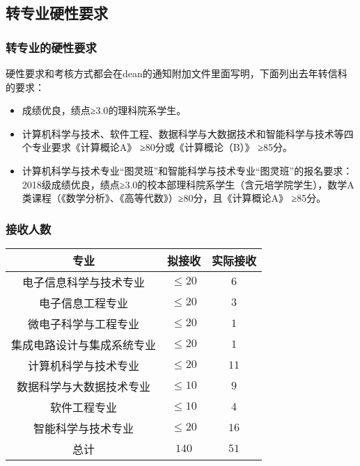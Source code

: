 \documentclass[12pt,AutoFakeBold]{beamer}
\begin{document}
    \subsection{转专业硬性要求}
    \begin{frame}
        \frametitle{转专业的硬性要求}
        硬性要求和考核方式都会在dean的通知附加文件里面写明，下面列出去年转信科的要求：

        \begin{itemize}
            \item 成绩优良，\alert{绩点≥3.0}的理科院系学生。
            \item 计算机科学与技术、软件工程、数据科学与大数据技术和智能科学与技术等四个专业要求\alert{《计算概论A》 ≥80分或《计算概论（B）》 ≥85分}。
            \item 计算机科学与技术专业“图灵班”和智能科学与技术专业“图灵班”的报名要求：2018级成绩优良，绩点≥3.0的校本部理科院系学生（含元培学院学生），数学A类课程（《数学分析》、《高等代数》）≥80分，且《计算概论A》 ≥85分。
        \end{itemize}
    \end{frame}
    \begin{frame}
        \frametitle{接收人数}
        \begin{center}
            \begin{tabular}{ccc}
                \toprule
                专业&拟接收&实际接收\\
                \midrule
                电子信息科学与技术专业&$≤20$&$6$\\
                电子信息工程专业&$≤20$&$3$\\
                微电子科学与工程专业&$≤20$&$1$\\
                集成电路设计与集成系统专业&$≤20$&$1$\\
                计算机科学与技术专业&$≤20$&$11$\\
                数据科学与大数据技术专业&$≤10$&$9$\\
                软件工程专业&$≤10$&$4$\\
                智能科学与技术专业&$≤20$&$16$\\
                总计&$140$&$51$\\
                \bottomrule
            \end{tabular}
        \end{center} 
    \end{frame}
\end{document}

